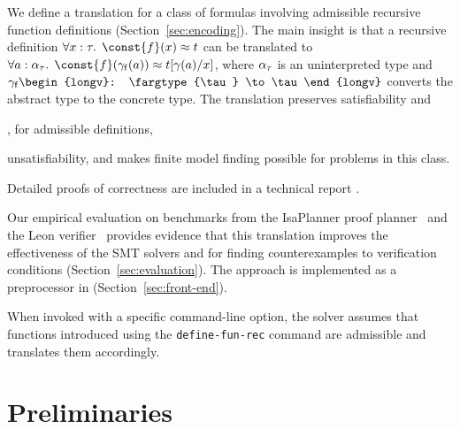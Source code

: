 We define a translation for a class of
formulas involving admissible recursive function definitions
(Section~\ref{sec:encoding}). The main insight is that a
recursive definition $\forall x : \tau.\;\, \const{f}(x) \teq t$
can be translated to
$\forall a :
\fargtype{\tau}.\;\, \const{f}(\farg{\con{f}}(a)) \teq t[\concret(a)/x]$, where
$\alpha_{\tau}$ is an uninterpreted  type and $\farg{\con{f}} \begin{longv}:
\fargtype{\tau} \to \tau\end{longv}$ converts the abstract type to the concrete
type. The translation preserves satisfiability and\begin{longv}, for admissible definitions,\end{longv}
unsatisfiability, and makes finite model finding possible for problems in this
class.\begin{shortv} Detailed proofs of correctness are included in a technical
report \cite{our-report}.\end{shortv}

Our empirical evaluation on benchmarks from the IsaPlanner proof planner~\cite{DBLP:conf/itp/JohanssonDB10}
and the Leon verifier~\cite{blanc2013overview} provides
evidence that this translation improves the effectiveness of the SMT solvers
\cvc and \ziii for finding counterexamples to verification conditions
(Section~\ref{sec:evaluation}). The approach is implemented as a preprocessor
in \cvc (Section~\ref{sec:front-end}).\begin{longv} When invoked with a specific
command-line option, the solver assumes that functions introduced using the
\texttt{define-fun-rec} command are admissible and translates them accordingly.\end{longv}


\section{Preliminaries}
\label{sec:prelim}

